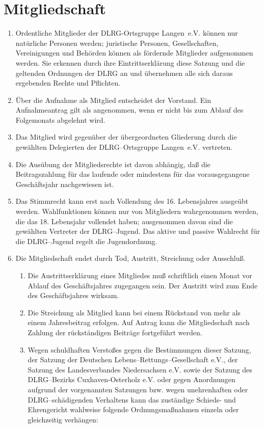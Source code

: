 \documentclass[%
12pt, %
a4paper, %
headsepline, %
footsepline, %
parskip, %
headings=normal, %
]{scrartcl}
\begin{document}
\section{Mitgliedschaft}
\label{sec:mitgliedschaft}
\begin{enumerate}
    \item Ordentliche Mitglieder der DLRG-Ortsgruppe Langen~e.V. können nur natürliche Personen werden; juristische Personen, Gesellschaften, Vereinigungen und Behörden können als fördernde Mitglieder aufgenommen werden. Sie erkennen durch ihre Eintrittserklärung diese Satzung und die geltenden Ordnungen der DLRG an und übernehmen alle sich daraus ergebenden Rechte und Pflichten.
    \item Über die Aufnahme als Mitglied entscheidet der Vorstand. Ein Aufnahmeantrag gilt als angenommen, wenn er nicht bis zum Ablauf des Folgemonats abgelehnt wird.
    \item Das Mitglied wird gegenüber der übergeordneten Gliederung durch die gewählten Delegierten der DLRG--Ortsgruppe Langen~e.V. vertreten.
    \item Die Ausübung der Mitgliedsrechte ist davon abhängig, daß die Beitragszahlung für das laufende oder mindestens für das vorausgegangene Geschäftsjahr nachgewiesen ist.
    \item Das Stimmrecht kann erst nach Vollendung des 16. Lebensjahres ausgeübt werden. Wahlfunktionen können nur von Mitgliedern wahrgenommen werden, die das 18. Lebensjahr vollendet haben; ausgenommen davon sind die gewählten Vertreter der DLRG--Jugend. Das aktive und passive Wahlrecht für die DLRG--Jugend regelt die Jugendordnung.
    \item Die Mitgliedschaft endet durch Tod, Austritt, Streichung oder Ausschluß.\begin{enumerate}[noitemsep]
        \item Die Austrittserklärung eines Mitgliedes muß schriftlich einen Monat vor Ablauf des Geschäftsjahres zugegangen sein. Der Austritt wird zum Ende des Geschäftsjahres wirksam.
        \item Die Streichung als Mitglied kann bei einem Rückstand von mehr als einem Jahresbeitrag erfolgen. Auf Antrag kann die Mitgliedschaft nach Zahlung der rückständigen Beiträge fortgeführt werden.
        \item Wegen schuldhaften Verstoßes gegen die Bestimmungen dieser Satzung, der Satzung der Deutschen Lebens--Rettungs--Gesellschaft e.V., der Satzung des Landesverbandes Niedersachsen e.V. sowie der Satzung des DLRG--Bezirks Cuxhaven-Osterholz e.V. oder gegen Anordnungen aufgrund der vorgenannten Satzungen bzw. wegen unehrenhaften oder DLRG--schädigenden Verhaltens kann das zuständige Schieds- und Ehrengericht wahlweise folgende Ordnungsmaßnahmen einzeln oder gleichzeitig verhängen:\begin{itemize}

\end{itemize}
\end{enumerate}
\end{enumerate}
\end{document}
